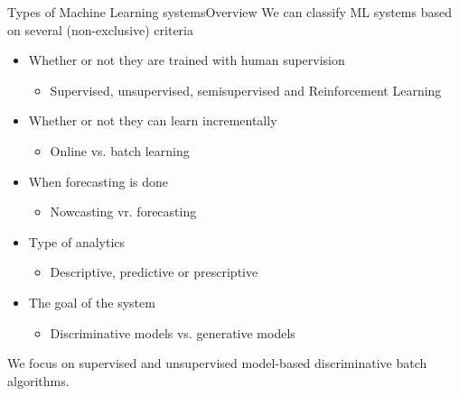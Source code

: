 \documentclass[10pt,compress]{beamer} %
\begin{document}
\begin{frame}{Types of Machine Learning systems}{Overview}
	We can classify ML systems based on several (non-exclusive) criteria
	\begin{itemize}
		\item Whether or not they are trained with human supervision
			\begin{itemize}
			\item Supervised, unsupervised, semisupervised and Reinforcement Learning
			\end{itemize}
		\item Whether or not they can learn incrementally
			\begin{itemize}
			\item Online vs. batch learning
			\end{itemize}
		\item When forecasting is done
			\begin{itemize}
			\item Nowcasting vr. forecasting
			\end{itemize}
		\item Type of analytics
			\begin{itemize}
			\item Descriptive, predictive or prescriptive
			\end{itemize}
		\item The goal of the system
			\begin{itemize}
			\item Discriminative models vs. generative models
			\end{itemize}
	\end{itemize}
	We focus on supervised and unsupervised model-based discriminative batch algorithms.
\end{frame}
\end{document}
